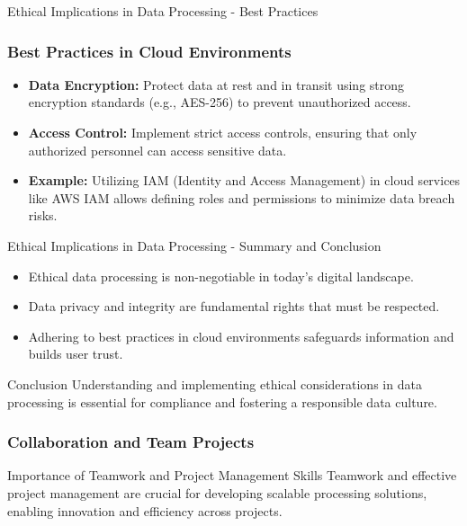 \documentclass[aspectratio=169]{beamer}
\begin{document}
\begin{frame}[fragile]{Ethical Implications in Data Processing - Best Practices}
    \frametitle{Best Practices in Cloud Environments}
    
    \begin{itemize}
        \item \textbf{Data Encryption:} Protect data at rest and in transit using strong encryption standards (e.g., AES-256) to prevent unauthorized access.
        \item \textbf{Access Control:} Implement strict access controls, ensuring that only authorized personnel can access sensitive data.
        
        \item \textbf{Example:} 
        Utilizing IAM (Identity and Access Management) in cloud services like AWS IAM allows defining roles and permissions to minimize data breach risks.
    \end{itemize}
\end{frame}

\begin{frame}[fragile]{Ethical Implications in Data Processing - Summary and Conclusion}
    \begin{itemize}
        \item Ethical data processing is non-negotiable in today's digital landscape.
        \item Data privacy and integrity are fundamental rights that must be respected.
        \item Adhering to best practices in cloud environments safeguards information and builds user trust.
    \end{itemize}
    
    \begin{block}{Conclusion}
        Understanding and implementing ethical considerations in data processing is essential for compliance and fostering a responsible data culture.
    \end{block}
\end{frame}

\begin{frame}[fragile]
    \frametitle{Collaboration and Team Projects}
    \begin{block}{Importance of Teamwork and Project Management Skills}
        Teamwork and effective project management are crucial for developing scalable processing solutions, enabling innovation and efficiency across projects.
    \end{block}
\end{frame}
\end{document}
